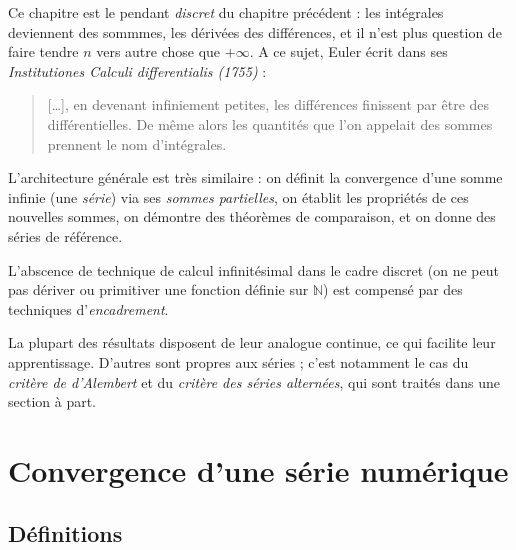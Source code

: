 \documentclass[
  french,
  letterpaper,
  DIV=11,
  numbers=noendperiod]{scrreprt}
\theoremstyle{plain}
\theoremstyle{definition}
\theoremstyle{plain}
\theoremstyle{plain}
\theoremstyle{definition}
\theoremstyle{definition}
\theoremstyle{plain}
\theoremstyle{remark}
\begin{document}

Ce chapitre est le pendant \emph{discret} du chapitre précédent : les
intégrales deviennent des sommmes, les dérivées des différences, et il
n'est plus question de faire tendre \(n\) vers autre chose que
\(+\infty\). A ce sujet, Euler écrit dans ses \emph{Institutiones
Calculi differentialis (1755)} :

\begin{quote}
{[}\ldots{]}, en devenant infiniement petites, les différences finissent
par être des différentielles. De même alors les quantités que l'on
appelait des sommes prennent le nom d'intégrales.
\end{quote}

L'architecture générale est très similaire : on définit la convergence
d'une somme infinie (une \emph{série}) via ses \emph{sommes partielles},
on établit les propriétés de ces nouvelles sommes, on démontre des
théorèmes de comparaison, et on donne des séries de référence.

L'abscence de technique de calcul infinitésimal dans le cadre discret
(on ne peut pas dériver ou primitiver une fonction définie sur
\(\mathbb{N}\)) est compensé par des techniques d'\emph{encadrement}.

La plupart des résultats disposent de leur analogue continue, ce qui
facilite leur apprentissage. D'autres sont propres aux séries ; c'est
notamment le cas du \emph{critère de d'Alembert} et du \emph{critère des
séries alternées}, qui sont traités dans une section à part.

\section{Convergence d'une série numérique}\label{sec-02-convergence}

\subsection{Définitions}\label{duxe9finitions}
\end{document}
